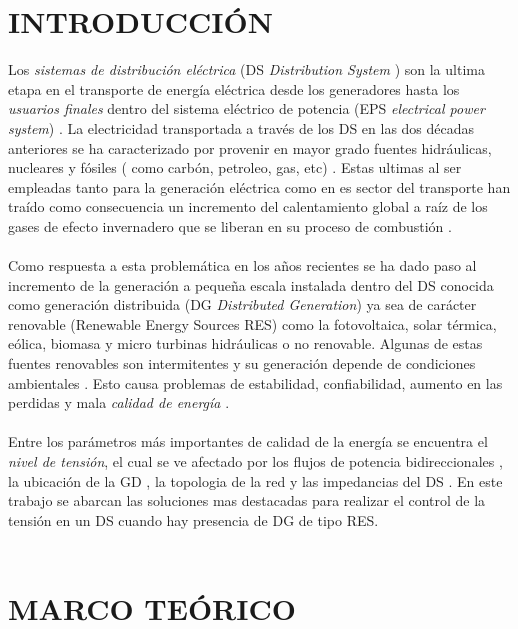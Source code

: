\documentclass[12pt, letterpaper]{report}
\begin{document}
\sloppy

\setlength{\parindent}{0cm}
\chapter*{INTRODUCCIÓN}
Los \textit{sistemas de distribución eléctrica} (DS \textit{Distribution System} ) son la ultima etapa en el transporte de energía eléctrica  desde los generadores hasta los \textit{usuarios finales} dentro del sistema eléctrico de potencia (EPS  \textit{electrical power system}) \cite{basso2004ieee}. La electricidad transportada a través de los DS en las dos décadas anteriores se ha caracterizado por provenir en mayor grado fuentes hidráulicas, nucleares y  fósiles ( como carbón, petroleo, gas, etc) \cite{Bacha2015}. Estas ultimas al ser empleadas tanto para la generación eléctrica como en es sector del transporte \cite{Bahmanifirouzi2012} han traído como consecuencia un incremento del calentamiento global a raíz  de los gases de efecto invernadero que se liberan en  su proceso de combustión  \cite{Hauck2017}.\\\\
Como respuesta a esta problemática en los años recientes se ha dado  paso al incremento de la generación a pequeña  escala instalada dentro del DS conocida como generación distribuida  (DG \textit{Distributed Generation}) ya sea de carácter renovable  (Renewable Energy Sources RES) como la fotovoltaica, solar térmica, eólica, biomasa y micro turbinas hidráulicas  \cite{Calderaro2014} o no renovable. Algunas de estas fuentes renovables son intermitentes y su generación depende de condiciones ambientales \cite{Mahmud2016}. Esto causa problemas de estabilidad, confiabilidad, aumento en las perdidas y mala \textit{calidad de energía} \cite{Karanki2014}\cite{DinakaraPrasadReddy2017}.\\\\ 
Entre los parámetros más importantes de  calidad de la energía se encuentra el \textit{nivel de tensión}, el cual se ve afectado por los flujos de potencia bidireccionales \cite{Koutsoukis2017}, la ubicación de la GD \cite{Othman2016a}, la topologia de la red y las impedancias del DS .  En este trabajo se abarcan las soluciones mas destacadas  para realizar el control de la tensión en un DS cuando hay presencia de DG de tipo RES. \\\\


\chapter{MARCO TEÓRICO}
\end{document}
